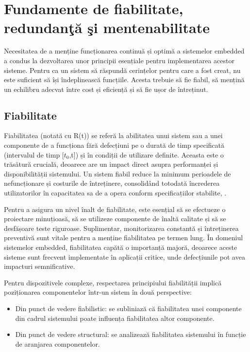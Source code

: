 \chapter{Fundamente de fiabilitate, redundanţă şi mentenabilitate}
\thispagestyle{pagestyle}
Necesitatea de a menține funcționarea continuă și optimă a sistemelor embedded a condus la dezvoltarea unor principii esențiale pentru implementarea acestor sisteme. Pentru ca un sistem să răspundă cerințelor pentru care a fost creat, nu este suficient să își îndeplinească funcțiile. Acesta trebuie să fie fiabil, să mențină un echilibru adecvat între cost și eficiență și să fie ușor de întreținut.

\section{Fiabilitate}
Fiabilitatea (notată cu R(t)) se referă la abilitatea unui sistem sau a unei componente de a funcționa fără defecțiuni pe o durată de timp specificată (intervalul de timp [$t_0$,t])
 și în condiții de utilizare definite. Aceasta este o trăsătură crucială, deoarece are un impact direct asupra performanței și disponibilității sistemului. Un sistem fiabil reduce la minimum perioadele de nefuncționare și costurile de întreținere, consolidând totodată încrederea utilizatorilor în capacitatea sa de a opera conform specificațiilor stabilite\cite{fiabilitate_curs}, \cite{fault_tolerant}.

 Pentru a asigura un nivel înalt de fiabilitate, este esențial să se efectueze o proiectare minuțioasă, să se utilizeze componente de înaltă calitate și să se desfășoare teste riguroase. Suplimentar, monitorizarea constantă și întreținerea preventivă sunt vitale pentru a menține fiabilitatea pe termen lung. În domeniul sistemelor embedded, fiabilitatea capătă o importanță majoră, deoarece aceste sisteme sunt frecvent implementate în aplicații critice, unde defecțiunile pot avea impacturi semnificative.

 Pentru dispozitivele complexe, respectarea principiului fiabilității implică poziționarea componentelor într-un sistem în două perspective:

\begin{itemize}
\item Din punct de vedere fiabilistic: se subliniază că fiabilitatea unei componente din cadrul sistemului poate influența fiabilitatea altor componente.
\item Din punct de vedere structural: se analizează fiabilitatea sistemului în funcție de aranjarea componentelor.
\end{itemize}


